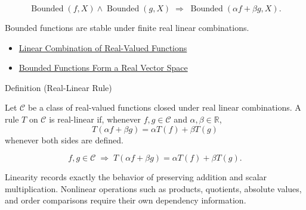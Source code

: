 \begin{remark*}
\[
  \operatorname{Bounded}(f,X)\wedge\operatorname{Bounded}(g,X)
  \;\Longrightarrow\;
  \operatorname{Bounded}(\alpha f+\beta g,X).
\]
\end{remark*}

\begin{remark*}[Interpretation]
Bounded functions are stable under finite real linear combinations.
\end{remark*}

\begin{dependencies}
\begin{itemize}
  \item \hyperref[def:linear-combination-of-real-valued-functions]{Linear Combination of Real-Valued Functions}
  \item \hyperref[thm:bounded-functions-form-real-vector-space]{Bounded Functions Form a Real Vector Space}
\end{itemize}
\end{dependencies}

\begin{definitionbox}{Definition (Real-Linear Rule)}
\begin{definition}
\label{def:real-linear-rule}
Let $\mathcal{C}$ be a class of real-valued functions closed under real
linear combinations.  A rule $T$ on $\mathcal{C}$ is real-linear if,
whenever $f,g\in\mathcal{C}$ and $\alpha,\beta\in\mathbb{R}$,
\[
  T(\alpha f+\beta g)=\alpha T(f)+\beta T(g)
\]
whenever both sides are defined.
\end{definition}
\end{definitionbox}

\begin{remark*}
\[
  f,g\in\mathcal{C}
  \;\Longrightarrow\;
  T(\alpha f+\beta g)=\alpha T(f)+\beta T(g).
\]
\end{remark*}

\begin{remark*}[Interpretation]
Linearity records exactly the behavior of preserving addition and scalar
multiplication. Nonlinear operations such as products, quotients, absolute
values, and order comparisons require their own dependency information.
\end{remark*}

